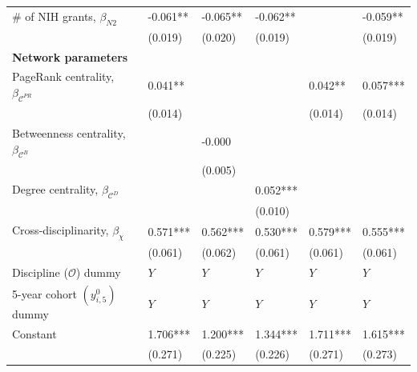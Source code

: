 \documentclass{article}\usepackage[]{graphicx}\usepackage[]{color}
\begin{document}
\begin{table}[h!]
\begin{center}
{\begin{tabular}{l l l l l l}
    \rowcolor{gray!33}
    {\#} of NIH grants, $\beta_{N2}$ 
    & -0.061**  & -0.065**   & -0.062**  &           & -0.059**  \\
    {} 
    & (0.019)   & (0.020)    & (0.019)   &           & (0.019)   \\
    
    \hline
    
    \textbf {Network parameters}\\
    
    \rowcolor{gray!33}
    PageRank centrality, $\beta_{\mathscr{C}^{PR}}$ 
    & 0.041**  &            &            & 0.042**   & 0.057***  \\
    {} 
    & (0.014)  &            &            & (0.014)   & (0.014)   \\
    
    \rowcolor{gray!33}
    Betweenness centrality, $\beta_{\mathscr{C}^{B}}$ 
    &          & -0.000     &            &           &           \\
    {} 
    &          & (0.005)    &            &           &           \\
    
    \rowcolor{gray!33}
    Degree centrality, $\beta_{\mathscr{C}^{D}}$ 
    &          &            & 0.052***   &           &            \\
    {} 
    &          &            & (0.010)    &           &            \\
    
    \rowcolor{gray!33}
    Cross-disciplinarity, $\beta_{\chi}$ 
    & 0.571*** & 0.562***   & 0.530***   & 0.579***  & 0.555***    \\
    {} 
    & (0.061)  & (0.062)    & (0.061)    & (0.061)   & (0.061)     \\
    
    \hline
    
    \rowcolor{gray!33} 
    Discipline ($\mathscr{O}$) dummy & $\textit{Y}$ & $\textit{Y}$ & $\textit{Y}$ & $\textit{Y}$ & $\textit{Y}$ \\
    
    \rowcolor{gray!33} 
    5-year cohort $(y{^0_{i,5}})$ dummy & $\textit{Y}$ & $\textit{Y}$ & $\textit{Y}$ & $\textit{Y}$ & $\textit{Y}$ \\
    
    \rowcolor{gray!33} 
    Constant 
    & 1.706*** & 1.200***   & 1.344***   & 1.711***  & 1.615***  \\
    {} 
    & (0.271)  & (0.225)    & (0.226)    & (0.271)   & (0.273)   \\
    

\end{tabular}}
\end{center}
\end{table}
\end{document}
